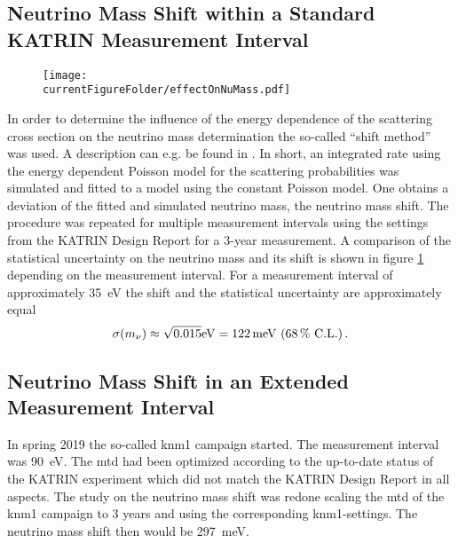 \subsection{Neutrino Mass Shift within a Standard KATRIN Measurement Interval}
\begin{figure}[t]
\texttt{[image: \\currentFigureFolder/effectOnNuMass.pdf]}
        \label{fig:energyDepCrossSecEffectOnNuMass}
\end{figure}
In order to determine the influence of the energy dependence of the scattering cross section on the neutrino mass determination the so-called ``shift method'' was used. A description can e.g. be found in \cite{SeitzM2019}.  In short, an integrated rate using the energy dependent Poisson model for the scattering probabilities was simulated and fitted to a model using the constant Poisson model. One obtains a deviation of the fitted and simulated neutrino mass, the neutrino mass shift. The procedure was repeated for multiple measurement intervals using the settings from the KATRIN Design Report \cite{Angrik:2005ep} for a 3-year measurement. A comparison of the statistical uncertainty on the neutrino mass and its shift is shown in figure \ref{fig:energyDepCrossSecEffectOnNuMass} depending on the measurement interval. For a measurement interval of approximately \SI{35}{eV} the shift and the statistical uncertainty are approximately equal
\begin{equation}
    \sigma(m_\nu) \approx 
    \sqrt{0.015}\SI{}{eV} = \SI{122}{meV} 
    \text{ (\SI{68}{\percent} C.L.)}
    \text{\,.}
\end{equation}

\subsection{Neutrino Mass Shift in an Extended  Measurement Interval}
In spring 2019 the so-called \gls{knm1} campaign started. The measurement interval was \SI{90}{eV}. The \gls{mtd} had been optimized according to the up-to-date status of the KATRIN experiment which did not match the KATRIN Design Report in all aspects. The study on the neutrino mass shift was redone scaling the \gls{mtd} of the \gls{knm1} campaign to 3 years and using the corresponding \gls{knm1}-settings. The neutrino mass shift then would be \SI{297}{meV}.


